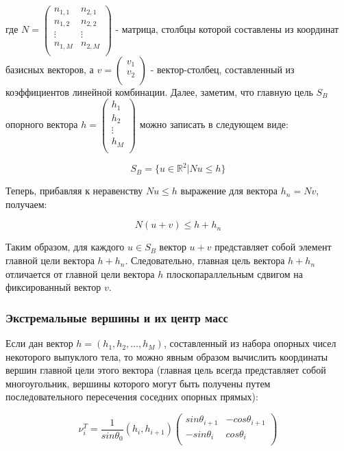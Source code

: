 \documentclass[a4paper,12pt, titlepage]{article}
\begin{document}
где $N = \left(
     \begin{array}{cc}
      n_{1, 1} & n_{2, 1} \\
      n_{1, 2} & n_{2, 2} \\
      \vdots & \vdots \\
      n_{1, M} & n_{2, M} \\
     \end{array}
     \right)$ - матрица, столбцы которой составлены из координат базисных
векторов, а
$v = \left(
     \begin{array}{c}
      v_{1} \\
      v_{2} \\
     \end{array}
     \right)$ - вектор-столбец, составленный из коэффициентов линейной
комбинации. Далее, заметим, что главную цель $S_{B}$ опорного вектора
$h = \left(
  \begin{array}{c}
   h_{1} \\
   h_{2} \\
   \vdots \\
   h_{M} \\
  \end{array}
  \right)$ можно записать в следующем виде:

$$
S_{B} = \{u \in \mathbb{R}^{2} | N u \leq h\}
$$

Теперь, прибавляя к неравенству $N u \leq h$ выражение для вектора
$h_{n} = N v$, получаем:
  
$$
N (u + v) \leq h + h_{n}
$$

Таким образом, для каждого $u \in S_{B}$ вектор $u + v$ представляет собой
элемент главной цели вектора $h + h_{n}$. Следовательно, главная цель вектора
$h + h_{n}$ отличается от главной цели вектора $h$ плоскопараллельным сдвигом на
фиксированный вектор $v$.

\subsubsection{Экстремальные вершины и их центр масс}

Если дан вектор $h = (h_{1}, h_{2}, \ldots, h_{M})$, составленный из набора
опорных чисел некоторого выпуклого тела, то можно явным образом вычислить
координаты вершин главной цели этого вектора (главная цель всегда представляет
собой многоугольник, вершины которого могут быть получены путем
последовательного пересечения соседних опорных прямых):

$$
\nu_{i}^{T} = \frac{1}{sin \theta_{0}} (h_{i},  h_{i + 1})
\left(
  \begin{array}{cc}
    sin \theta_{i + 1} & - cos \theta_{i + 1} \\
    - sin \theta_{i} & cos \theta_{i} \\
  \end{array}
\right)
$$
\end{document}
